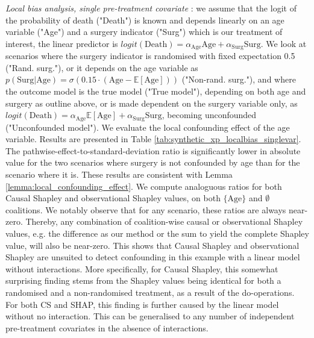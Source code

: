 \textit{Local bias analysis, single pre-treatment covariate} :  we assume that the logit of the probability of death ("Death") is known and depends linearly on an age variable ("Age") and a surgery indicator ("Surg") which is our treatment of interest, the linear predictor is $logit(\text{Death}) = \alpha_\text{Age} \text{Age} + \alpha_\text{Surg} \text{Surg}$. We look at scenarios where the surgery indicator is randomised with fixed expectation 0.5 ("Rand. surg."), or it depends on the age variable as $p(\text{Surg} | \text{Age}) = \sigma(0.15 \cdot (\text{Age} - \mathbb{E}[\text{Age}]))$ ("Non-rand. surg."), and where the outcome model is the true model ("True model"), depending on both age and surgery as outline above, or is made dependent on the surgery variable only, as $logit(\text{Death}) = \alpha_\text{Age} \mathbb{E}[\text{Age}] + \alpha_\text{Surg} \text{Surg}$, becoming unconfounded ("Unconfounded model"). We evaluate the local confounding effect of the age variable. Results are presented in Table \ref{tab:synthetic_xp_localbias_singlevar}. The pathwise-effect-to-standard-deviation ratio is significantly lower in absolute value for the two scenarios where surgery is not confounded by age than for the scenario where it is. These results are consistent with Lemma \ref{lemma:local_confounding_effect}. We compute analoguous ratios for both Causal Shapley and observational Shapley values, on both $\{\text{Age}\}$ and $\emptyset$ coalitions. We notably observe that for any scenario, these ratios are always near-zero. Thereby, any combination of coalition-wise causal or observational Shapley values, e.g. the difference as our method or the sum to yield the complete Shapley value, will also be near-zero. This shows that Causal Shapley and observational Shapley are unsuited to detect confounding in this example with a linear model without interactions. More specifically, for Causal Shapley, this somewhat surprising finding stems from the Shapley values being identical for both a randomised and a non-randomised treatment, as a result of the do-operations. For both CS and SHAP, this finding is further caused by the linear model without no interaction. This can be generalised to any number of independent pre-treatment covariates in the absence of interactions. 
    
